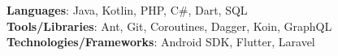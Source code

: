 \small{\item{
     \textbf{Languages}{: Java, Kotlin, PHP, C\#, Dart, SQL} \\
     \textbf{Tools/Libraries}{: Ant, Git, Coroutines, Dagger, Koin, GraphQL} \\
     \textbf{Technologies/Frameworks}{: Android SDK, Flutter, Laravel} \\
    }}